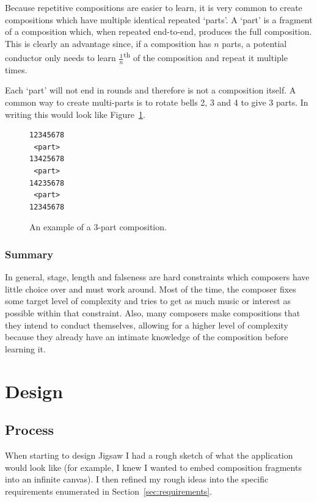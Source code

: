 \documentclass[12pt]{article}
\newcommand{\nth}[2]{#1\textsuperscript{#2}}
\begin{document}
Because repetitive compositions are easier to learn, it is very common to create compositions which
have multiple identical repeated `parts'.  A `part' is a fragment of a composition which, when repeated end-to-end, produces
the full composition.  This is clearly an advantage since, if a composition has $n$ parts, a potential
conductor only needs to learn \nth{$\frac{1}{n}$}{th} of the composition and repeat it multiple
times.

Each `part' will not end in rounds and therefore is not a composition itself.  A common way to
create multi-parts is to rotate bells 2, 3 and 4 to give 3 parts.  In writing this would look like
Figure~\ref{fig:multi-part}.

\begin{figure}
    \centering
    \begin{BVerbatim}
12345678
 <part>
13425678
 <part>
14235678
 <part>
12345678
    \end{BVerbatim}
    \caption{An example of a 3-part composition.}\label{fig:multi-part}
\end{figure}

\subsubsection{Summary}

In general, stage, length and falseness are hard constraints which composers have little choice over
and must work around.  Most of the time, the composer fixes some target level of complexity and
tries to get as much music or interest as possible within that constraint.  Also, many composers
make compositions that they intend to conduct themselves, allowing for a higher level of complexity
because they already have an intimate knowledge of the composition before learning it.



\pagebreak

\section{Design}

\subsection{Process}

When starting to design Jigsaw I had a rough sketch of what the application would look like (for
example, I knew I wanted to embed composition fragments into an infinite canvas).  I then refined my
rough ideas into the specific requirements enumerated in Section~\ref{sec:requirements}.
\end{document}
